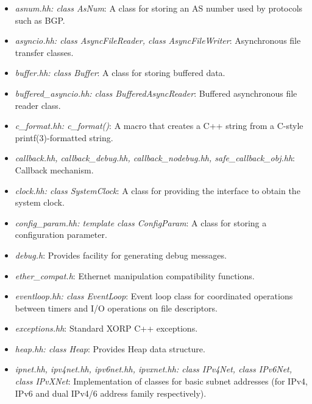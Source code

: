 \documentclass[11pt]{article}
\begin{document}
\begin{itemize}

  \item \emph{asnum.hh: class AsNum}: A class for storing an AS number
  used by protocols such as BGP.

  \item \emph{asyncio.hh: class AsyncFileReader, class AsyncFileWriter}:
  Asynchronous file transfer classes.

  \item \emph{buffer.hh: class Buffer}:  A class for storing buffered
  data.

  \item \emph{buffered\_asyncio.hh: class BufferedAsyncReader}:
  Buffered asynchronous file reader class.

  \item \emph{c\_format.hh: c\_format()}: A macro that creates a C++ string
  from a C-style printf(3)-formatted string.

  \item \emph{callback.hh, callback\_debug.hh, callback\_nodebug.hh,
  safe\_callback\_obj.hh}:
  Callback mechanism.

  \item \emph{clock.hh: class SystemClock}: A class for providing the
  interface to obtain the system clock.

  \item \emph{config\_param.hh: template class ConfigParam}: A class for
  storing a configuration parameter.

  \item \emph{debug.h}: Provides facility for generating debug messages.

  \item \emph{ether\_compat.h}: Ethernet manipulation compatibility functions.

  \item \emph{eventloop.hh: class EventLoop}: Event loop class for
  coordinated operations between timers and I/O operations on file
  descriptors.

  \item \emph{exceptions.hh}: Standard XORP C++ exceptions.

  \item \emph{heap.hh: class Heap}: Provides Heap data structure.

  \item \emph{ipnet.hh, ipv4net.hh, ipv6net.hh, ipvxnet.hh: class
  IPv4Net, class IPv6Net, class IPvXNet}: Implementation of classes for
  basic subnet addresses (for IPv4, IPv6 and dual IPv4/6 address family
  respectively).


\end{itemize}
\end{document}
